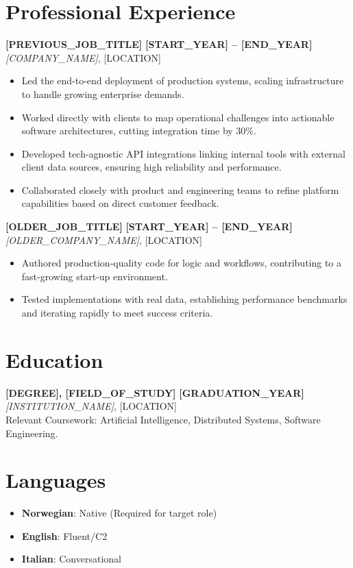 \documentclass[11pt,a4paper]{article}
\begin{document}
\section*{Professional Experience}
\textbf{[PREVIOUS\_JOB\_TITLE]} \hfill \textbf{[START\_YEAR] -- [END\_YEAR]} \\
\textit{[COMPANY\_NAME]}, [LOCATION]
\begin{itemize}
    \item Led the end-to-end deployment of production systems, scaling infrastructure to handle growing enterprise demands.
    \item Worked directly with clients to map operational challenges into actionable software architectures, cutting integration time by 30\%.
    \item Developed tech-agnostic API integrations linking internal tools with external client data sources, ensuring high reliability and performance.
    \item Collaborated closely with product and engineering teams to refine platform capabilities based on direct customer feedback.
\end{itemize}

\textbf{[OLDER\_JOB\_TITLE]} \hfill \textbf{[START\_YEAR] -- [END\_YEAR]} \\
\textit{[OLDER\_COMPANY\_NAME]}, [LOCATION]
\begin{itemize}
    \item Authored production-quality code for logic and workflows, contributing to a fast-growing start-up environment.
    \item Tested implementations with real data, establishing performance benchmarks and iterating rapidly to meet success criteria.
\end{itemize}

\section*{Education}
\textbf{[DEGREE], [FIELD\_OF\_STUDY]} \hfill \textbf{[GRADUATION\_YEAR]} \\
\textit{[INSTITUTION\_NAME]}, [LOCATION] \\
Relevant Coursework: Artificial Intelligence, Distributed Systems, Software Engineering.

\section*{Languages}
\begin{itemize}
    \item \textbf{Norwegian}: Native (Required for target role)
    \item \textbf{English}: Fluent/C2
    \item \textbf{Italian}: Conversational
\end{itemize}
\end{document}
